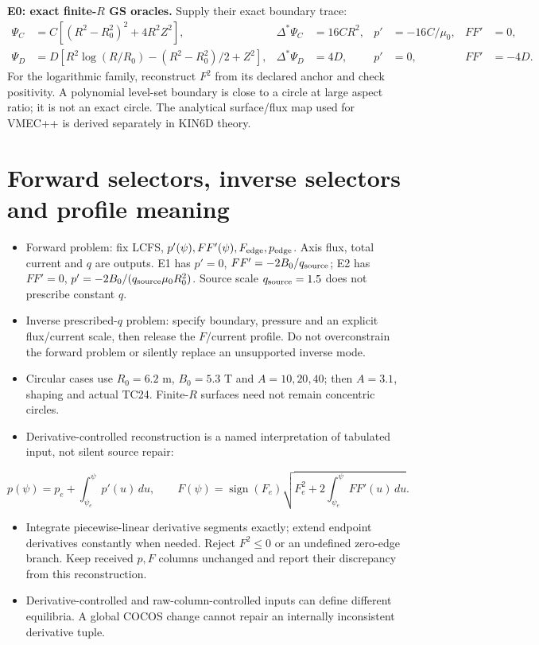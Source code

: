 \documentclass[11pt,a4paper]{article}
\newcommand{\ds}{\Delta^*}
\newcommand{\pp}{p'}
\begin{document}
\textbf{E0: exact finite-$R$ GS oracles.} Supply their exact boundary trace:
\begin{align*}
\Psi_C&=C[(R^2-R_0^2)^2+4R^2Z^2],
&\ds\Psi_C&=16CR^2,&\pp&=-16C/\mu_0,&FF'&=0,\\
\Psi_D&=D[R^2\log(R/R_0)-(R^2-R_0^2)/2+Z^2],
&\ds\Psi_D&=4D,&\pp&=0,&FF'&=-4D.
\end{align*}
For the logarithmic family, reconstruct $F^2$ from its declared anchor and check positivity. A polynomial level-set boundary is close to a circle at large aspect ratio; it is not an exact circle. The analytical surface/flux map used for VMEC++ is derived separately in KIN6D theory.

\section*{Forward selectors, inverse selectors and profile meaning}
\begin{itemize}
\item Forward problem: fix LCFS, $\pp(\psi),FF'(\psi),F_{\rm edge},p_{\rm edge}$. Axis flux, total current and $q$ are outputs. E1 has $\pp=0$, $FF'=-2B_0/q_{\rm source}$; E2 has $FF'=0$, $\pp=-2B_0/(q_{\rm source}\mu_0R_0^2)$. Source scale $q_{\rm source}=1.5$ does not prescribe constant $q$.
\item Inverse prescribed-$q$ problem: specify boundary, pressure and an explicit flux/current scale, then release the $F$/current profile. Do not overconstrain the forward problem or silently replace an unsupported inverse mode.
\item Circular cases use $R_0=6.2$ m, $B_0=5.3$ T and $A=10,20,40$; then $A=3.1$, shaping and actual TC24. Finite-$R$ surfaces need not remain concentric circles.
\item Derivative-controlled reconstruction is a named interpretation of tabulated input, not silent source repair:
\end{itemize}
\[
 p(\psi)=p_e+\int_{\psi_e}^{\psi}\pp(u)\,du,\qquad
 F(\psi)=\operatorname{sign}(F_e)\sqrt{F_e^2+2\int_{\psi_e}^{\psi}FF'(u)\,du}.
\]
\begin{itemize}
\item Integrate piecewise-linear derivative segments exactly; extend endpoint derivatives constantly when needed. Reject $F^2\leq0$ or an undefined zero-edge branch. Keep received $p,F$ columns unchanged and report their discrepancy from this reconstruction.
\item Derivative-controlled and raw-column-controlled inputs can define different equilibria. A global COCOS change cannot repair an internally inconsistent derivative tuple.
\end{itemize}
\end{document}
